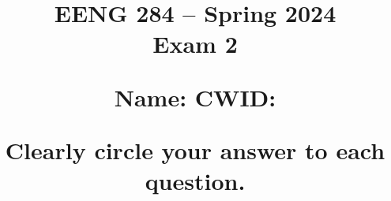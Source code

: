 \documentclass{article}
\begin{document}
\newcommand{\bs}{\backslash}


\title{
\normalsize{EENG 284 -- Spring 2024}\\
\normalsize{Exam 2} \\

\vspace{0.2 in}

Name: \fbox{\rule{2in}{0pt}\rule[-0.5ex]{0pt}{4ex}}
CWID: \fbox{\rule{1in}{0pt}\rule[-0.5ex]{0pt}{4ex}} \\
\date{}
\vspace{0.2 in}
Clearly circle your answer to each question.
}

\maketitle{}
\end{document}
